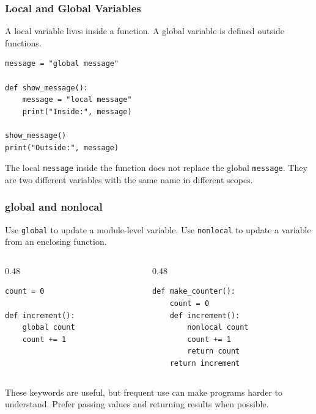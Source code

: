 \documentclass[aspectratio=169,10pt]{beamer}
\newcommand{\codeword}[1]{\texttt{#1}}
\begin{document}
\begin{frame}[fragile]
\frametitle{Local and Global Variables}
\small
A local variable lives inside a function. A global variable is defined outside functions.

\vspace{0.1cm}
\begin{lstlisting}[style=pycode]
message = "global message"

def show_message():
    message = "local message"
    print("Inside:", message)

show_message()
print("Outside:", message)
\end{lstlisting}

\begin{tcolorbox}[lecturebox,title=What happens?]
The local \texttt{message} inside the function does not replace the global \texttt{message}. They are two different variables with the same name in different scopes.
\end{tcolorbox}
\end{frame}

\begin{frame}[fragile]
\frametitle{global and nonlocal}
\small
Use \codeword{global} to update a module-level variable. Use \codeword{nonlocal} to update a variable from an enclosing function.

\vspace{0.1cm}
\begin{columns}[T,totalwidth=0.96\textwidth]
\begin{column}{0.48\textwidth}
\begin{lstlisting}[style=pycodesmall]
count = 0

def increment():
    global count
    count += 1
\end{lstlisting}
\end{column}
\begin{column}{0.48\textwidth}
\begin{lstlisting}[style=pycodesmall]
def make_counter():
    count = 0
    def increment():
        nonlocal count
        count += 1
        return count
    return increment
\end{lstlisting}
\end{column}
\end{columns}

\begin{tcolorbox}[lecturebox,title=Beginner warning]
These keywords are useful, but frequent use can make programs harder to understand. Prefer passing values and returning results when possible.
\end{tcolorbox}
\end{frame}
\end{document}
